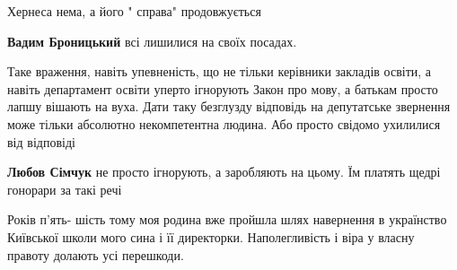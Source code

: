 \begin{itemize}
Хернеса нема, а його " справа" продовжується

\begin{itemize}
 
\textbf{Вадим Броницький} всі лишилися на своїх посадах.
\end{itemize}

 

Таке враження, навіть упевненість, що не тільки керівники закладів освіти, а
навіть департамент освіти уперто ігнорують Закон про мову, а батькам просто
лапшу вішають на вуха. Дати таку безглузду відповідь на депутатське звернення
може тільки абсолютно некомпетентна людина. Або просто свідомо ухилилися від
відповіді

\begin{itemize}
 
\textbf{Любов Сімчук} не просто ігнорують, а заробляють на цьому. Їм платять щедрі гонорари за такі речі
\end{itemize}

 

Років п'ять- шість тому моя родина вже пройшла шлях навернення в українство
Київської школи мого сина і її директорки. Наполегливість і віра у власну
правоту долають усі перешкоди.


 


\end{itemize}
